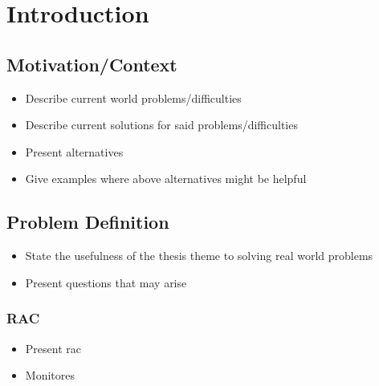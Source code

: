 
%

\chapter{Introduction}
\label{cha:introduction}

\section{Motivation/Context}
\label{sec:motivation_context}

\begin{itemize}
    \item Describe current world problems/difficulties
    \item Describe current solutions for said problems/difficulties
    \item Present alternatives
    \item Give examples where above alternatives might be helpful
\end{itemize}

\section{Problem Definition}
\label{sub:problem_definition}

\begin{itemize}
    \item State the usefulness of the thesis theme to solving real world problems
    \item Present questions that may arise
\end{itemize}

\subsection{RAC}
\label{sub:rac}

\begin{itemize}
    \item Present \gls{rac}
\end{itemize}

\begin{itemize}
    \item Monitores
\end{itemize}

